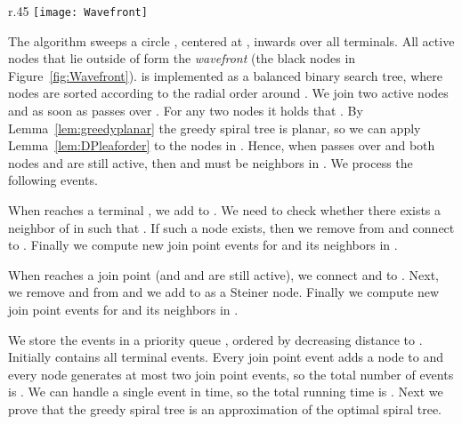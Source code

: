 \documentclass{journalA4}
\begin{document}
\begin{wrapfigure}[9]{r}{.45\textwidth}
  \centering
  \texttt{[image: Wavefront]}
  \small{\caption{The wavefront .\label{fig:Wavefront}}}
\end{wrapfigure}
The algorithm sweeps a circle , centered at , inwards over all terminals. All active nodes that lie outside of  form the \emph{wavefront}
 (the black nodes in Figure~\ref{fig:Wavefront}).  is implemented as a balanced binary search tree, where nodes are sorted according to the radial order
around . We join two active nodes  and  as soon as  passes over . For any two nodes  it holds that .
By Lemma~\ref{lem:greedyplanar} the greedy spiral tree is planar, so we can apply Lemma~\ref{lem:DPleaforder} to the nodes in . Hence, when  passes over  and both nodes 
and  are still active, then  and  must be neighbors in . We process the following events.
\begin{description}\itemsep0pt
  \item[Terminal.] When  reaches a terminal , we add  to . We need to check whether there exists a neighbor  of  in  such that . If such a node  exists, then we remove  from  and connect  to . Finally we compute new join point events for  and its neighbors in .
  \item[Join point.] When  reaches a join point  (and  and  are still active), we connect  and  to . Next, we remove  and  from  and we add  to  as a Steiner node. Finally we compute new join point events for  and its neighbors in .
\end{description}
We store the events in a priority queue , ordered by decreasing distance to . Initially  contains all terminal events. Every join point event adds a
node to  and every node generates at most two join point events, so the total number of events is . We can handle a single event in  time, so the total running
time is .
Next we prove that the greedy spiral tree is an approximation of the optimal spiral tree.
\end{document}
